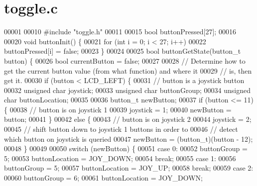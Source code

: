 \section{toggle.\+c}
\label{toggle_8c_source}

\begin{DoxyCode}
00001 
00010 \textcolor{preprocessor}{#include "toggle.h"}
00011 
00015 \textcolor{keywordtype}{bool} buttonPressed[27];
00016 
00020 \textcolor{keywordtype}{void} buttonInit() \{
00021     \textcolor{keywordflow}{for} (\textcolor{keywordtype}{int} i = 0; i < 27; i++)
00022         buttonPressed[i] = \textcolor{keyword}{false};
00023 \}
00024 
00025 \textcolor{keywordtype}{bool} buttonGetState(button_t button) \{
00026     \textcolor{keywordtype}{bool} currentButton = \textcolor{keyword}{false};
00027 
00028     \textcolor{comment}{// Determine how to get the current button value (from what function) and where it}
00029     \textcolor{comment}{// is, then get it.}
00030     \textcolor{keywordflow}{if} (button < LCD_LEFT) \{
00031         \textcolor{comment}{// button is a joystick button}
00032         \textcolor{keywordtype}{unsigned} \textcolor{keywordtype}{char} joystick;
00033         \textcolor{keywordtype}{unsigned} \textcolor{keywordtype}{char} buttonGroup;
00034         \textcolor{keywordtype}{unsigned} \textcolor{keywordtype}{char} buttonLocation;
00035 
00036         button_t newButton;
00037         \textcolor{keywordflow}{if} (button <= 11) \{
00038             \textcolor{comment}{// button is on joystick 1}
00039             joystick = 1;
00040             newButton = button;
00041         \}
00042         \textcolor{keywordflow}{else} \{
00043             \textcolor{comment}{// button is on joystick 2}
00044             joystick = 2;
00045             \textcolor{comment}{// shift button down to joystick 1 buttons in order to}
00046             \textcolor{comment}{// detect which button on joystick is queried}
00047             newButton = (button_t)(button - 12);
00048         \}
00049 
00050         \textcolor{keywordflow}{switch} (newButton) \{
00051         \textcolor{keywordflow}{case} 0:
00052             buttonGroup = 5;
00053             buttonLocation = JOY\_DOWN;
00054             \textcolor{keywordflow}{break};
00055         \textcolor{keywordflow}{case} 1:
00056             buttonGroup = 5;
00057             buttonLocation = JOY\_UP;
00058             \textcolor{keywordflow}{break};
00059         \textcolor{keywordflow}{case} 2:
00060             buttonGroup = 6;
00061             buttonLocation = JOY\_DOWN;

\end{DoxyCode}
